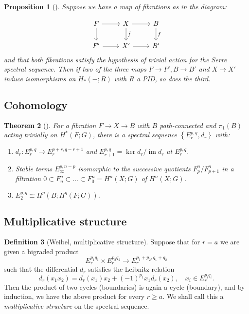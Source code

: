 \documentclass[reqno]{amsart}
\newtheorem{theorem}{Theorem}[section]
\newtheorem{proposition}[theorem]{Proposition}
\theoremstyle{definition}
\newtheorem{definition}[theorem]{Definition}
\theoremstyle{remark}
\DeclareMathOperator{\im}{im}
\begin{document}
\begin{proposition}[]
    Suppose we have a map of fibrations
    as in the diagram:

\begin{equation*}
\begin{tikzcd}
    F \ar[r] \ar[d] & X \ar[r] \ar[d, "\tilde{f}"] &
    B \ar[d, "f"] \\
    F' \ar[r] & X' \ar[r] & B'
\end{tikzcd}
\end{equation*}
and that both fibrations satisfy the hypothesis of trivial
action for the Serre spectral sequence. Then if
two of the three maps $F \to F', B \to B'$ and
$X \to X'$ induce isomorphisms
on $H_* \left( - ; R \right) $ with $R$ a PID,
so does the third.




\end{proposition}




\subsection{Cohomology}

\begin{theorem}[]
    For a fibration $F \to X \to B$ with
    $B$ path-connected and $\pi_1 (B)$ acting
    trivially on $H^{*}(F;G)$, there is a spectral
    sequence $\left\{ E_r^{p,q}, d_r \right\} $ with:
    \begin{enumerate}
        \item $d_r \colon E_r^{p,q} \to E_{r}^{p+r, q-r+1}$ 
            and $E_{r+1}^{p,q} = \ker d_r / \im d_r$ at
            $E_{r}^{p,q}$.
        \item Stable terms $E_{\infty}^{p,n-p}$ isomorphic
            to the successive quotients
            $F_p^{n} / F_{p+1}^{n}$ in a filtration
            $0 \subset F_{n}^{n} \subset \ldots \subset 
            F_0^{n} = H^{n}(X;G)$ of $H^{n}(X;G)$.
        \item $E_2^{p,q} \cong H^{p}(B;H^{q}(F;G))$.
    \end{enumerate}
\end{theorem}

\subsection{Multiplicative structure}

\begin{definition}[Weibel, multiplicative structure]
    Suppose that for $r = a$ we are given a
    bigraded product
    \[
    E^{p_1 q_1}_{r} \times E^{p_2q_2}_{r} \to 
    E^{p_1+p_2 , q_1+ q_2}_{r}
    \] 
    such that the differential $d_{r}$ satisfies
    the Leibnitz relation
    \[
    d_{r}(x_1 x_2) = d_{r}(x_1) x_2 + 
    (-1)^{p_1} x_1 d_{r}(x_2), \quad x_i \in E^{p_i q_i}_{r}.
    \] 
    Then the product of two cycles (boundaries)
    is again a cycle (boundary), and
    by induction, we have the above product for every
    $r \ge a$. We shall call this a \textit{multiplicative structure}
    on the spectral sequence. 
\end{definition}
\end{document}
